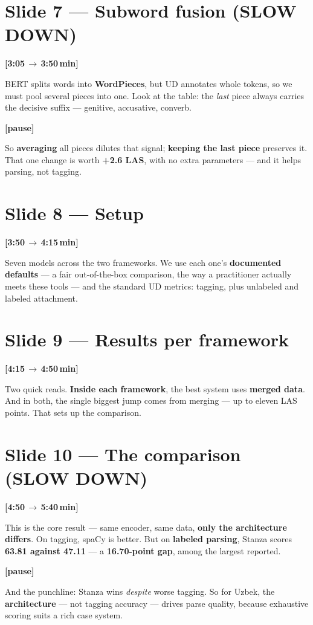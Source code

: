 \documentclass[12pt,a4paper]{article}
\newcommand{\timing}[2]{%
   \par\noindent\textbf{\small [#1\,$\to$\,#2\,min]}\par\vspace{0.15em}}
\newcommand{\say}[1]{\textbf{#1}}
\newcommand{\breathe}{\par\vspace{0.3em}\textbf{[pause]}\par}
\begin{document}
\section*{Slide 7 --- Subword fusion (SLOW DOWN)}
\timing{3:05}{3:50}
BERT splits words into \say{WordPieces}, but UD annotates whole tokens,
so we must pool several pieces into one. Look at the table: the
\emph{last} piece always carries the decisive suffix --- genitive,
accusative, converb. \breathe So \say{averaging} all pieces dilutes that
signal; \say{keeping the last piece} preserves it. That one change is
worth \say{+2.6 LAS}, with no extra parameters --- and it helps parsing,
not tagging.

\section*{Slide 8 --- Setup}
\timing{3:50}{4:15}
Seven models across the two frameworks. We use each one's \say{documented
defaults} --- a fair out-of-the-box comparison, the way a practitioner
actually meets these tools --- and the standard UD metrics: tagging, plus
unlabeled and labeled attachment.

\section*{Slide 9 --- Results per framework}
\timing{4:15}{4:50}
Two quick reads. \say{Inside each framework}, the best system uses
\say{merged data}. And in both, the single biggest jump comes from
merging --- up to eleven LAS points. That sets up the comparison.

\section*{Slide 10 --- The comparison (SLOW DOWN)}
\timing{4:50}{5:40}
This is the core result --- same encoder, same data, \say{only the
architecture differs}. On tagging, spaCy is better. But on \say{labeled
parsing}, Stanza scores \say{63.81 against 47.11} --- a \say{16.70-point
gap}, among the largest reported. \breathe And the punchline: Stanza wins
\emph{despite} worse tagging. So for Uzbek, the \say{architecture} --- not
tagging accuracy --- drives parse quality, because exhaustive scoring
suits a rich case system.

\end{document}
